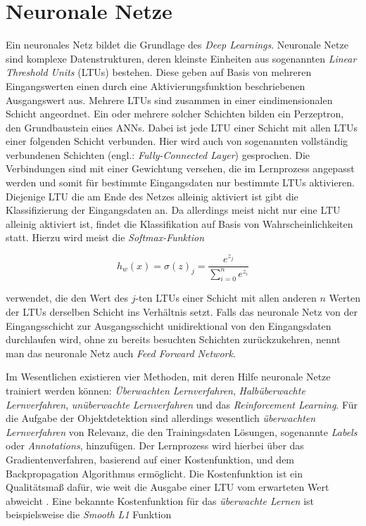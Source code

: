 \section{Neuronale Netze} \label{anns}

Ein neuronales Netz bildet die Grundlage des \textit{Deep Learnings}. Neuronale Netze sind komplexe Datenstrukturen, deren kleinste Einheiten aus sogenannten \textit{Linear Threshold Units} (LTUs) bestehen. Diese geben auf Basis von mehreren Eingangswerten einen durch eine Aktivierungsfunktion beschriebenen Ausgangswert aus. Mehrere LTUs sind zusammen in einer eindimensionalen Schicht angeordnet. Ein oder mehrere solcher Schichten bilden ein Perzeptron, den Grundbaustein eines ANNs. Dabei ist jede LTU einer Schicht mit allen LTUs einer folgenden Schicht verbunden. Hier wird auch von sogenannten vollständig verbundenen Schichten (engl.: \textit{Fully-Connected Layer}) gesprochen. Die Verbindungen sind mit einer Gewichtung versehen, die im Lernprozess angepasst werden und somit für bestimmte Eingangsdaten nur bestimmte LTUs aktivieren. Diejenige LTU die am Ende des Netzes alleinig aktiviert ist gibt die Klassifizierung der Eingangsdaten an. Da allerdings meist nicht nur eine LTU alleinig aktiviert ist, findet die Klassifikation auf Basis von Wahrscheinlichkeiten statt. Hierzu wird meist die \textit{Softmax-Funktion}

\begin{equation} \label{softmax}
h_{w}(x) = \sigma(z)_j = \frac{e^{z_j}}{\sum_{i=0}^n e^{z_i} }
\end{equation}

verwendet, die den Wert des $j$-ten LTUs einer Schicht mit allen anderen $n$ Werten der LTUs derselben Schicht ins Verhältnis setzt. Falls das neuronale Netz von der Eingangsschicht zur Ausgangsschicht unidirektional von den Eingangsdaten durchlaufen wird, ohne zu bereits besuchten Schichten zurückzukehren, nennt man das neuronale Netz auch \textit{Feed Forward Network}.

Im Wesentlichen existieren vier Methoden, mit deren Hilfe neuronale Netze trainiert werden können: \textit{Überwachten Lernverfahren}, \textit{Halbüberwachte Lernverfahren}, \textit{unüberwachte Lernverfahren} und das \textit{Reinforcement Learning}. Für die Aufgabe der Objektdetektion sind allerdings wesentlich \textit{überwachten Lernverfahren} von Relevanz, die den Trainingsdaten Lösungen, sogenannte \textit{Labels} oder \textit{Annotations}, hinzufügen. Der Lernprozess wird hierbei über das Gradientenverfahren, basierend auf einer Kostenfunktion, und dem Backpropagation Algorithmus ermöglicht. Die Kostenfunktion ist ein Qualitätsmaß dafür, wie weit die Ausgabe einer LTU vom erwarteten Wert abweicht \cite{AurelienGeron.2018}. Eine bekannte Kostenfunktion für das \textit{überwachte Lernen} ist beispielsweise die \textit{Smooth L1} Funktion


